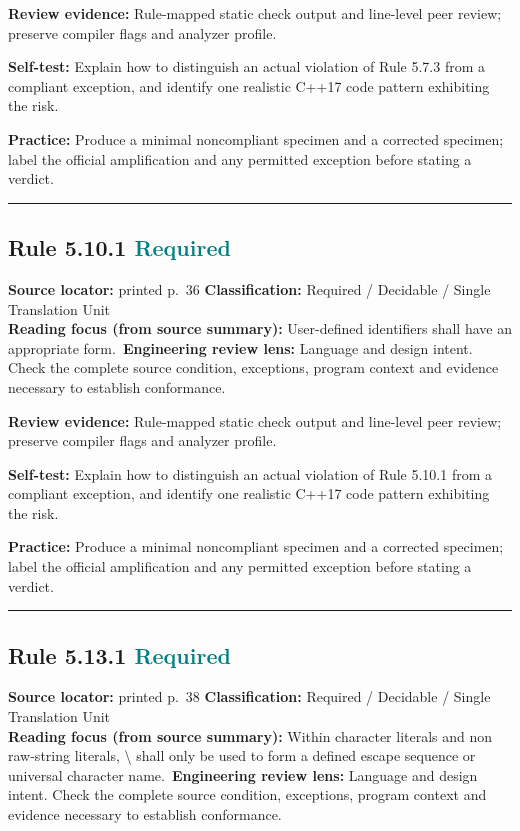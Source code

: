 \documentclass[10pt,letterpaper]{article}
\begin{document}
\textbf{Review evidence:} Rule-mapped static check output and line-level peer review; preserve compiler flags and analyzer profile.

\textbf{Self-test:} Explain how to distinguish an actual violation of Rule 5.7.3 from a compliant exception, and identify one realistic C++17 code pattern exhibiting the risk.\par
\textbf{Practice:} Produce a minimal noncompliant specimen and a corrected specimen; label the official amplification and any permitted exception before stating a verdict.
\smallskip\hrule\smallskip
\subsection*{Rule 5.10.1 \enspace \texorpdfstring{\small\textcolor{teal}{Required}}{Required}}
\noindent\textbf{Source locator:} printed p.~36 \quad\textbf{Classification:} Required / Decidable / Single Translation Unit\\
\textbf{Reading focus (from source summary):} User-defined identifiers shall have an appropriate form.\
\textbf{Engineering review lens:} Language and design intent. Check the complete source condition, exceptions, program context and evidence necessary to establish conformance.

\textbf{Review evidence:} Rule-mapped static check output and line-level peer review; preserve compiler flags and analyzer profile.

\textbf{Self-test:} Explain how to distinguish an actual violation of Rule 5.10.1 from a compliant exception, and identify one realistic C++17 code pattern exhibiting the risk.\par
\textbf{Practice:} Produce a minimal noncompliant specimen and a corrected specimen; label the official amplification and any permitted exception before stating a verdict.
\smallskip\hrule\smallskip
\subsection*{Rule 5.13.1 \enspace \texorpdfstring{\small\textcolor{teal}{Required}}{Required}}
\noindent\textbf{Source locator:} printed p.~38 \quad\textbf{Classification:} Required / Decidable / Single Translation Unit\\
\textbf{Reading focus (from source summary):} Within character literals and non raw-string literals, \textbackslash{} shall only be used to form a defined escape sequence or universal character name.\
\textbf{Engineering review lens:} Language and design intent. Check the complete source condition, exceptions, program context and evidence necessary to establish conformance.
\end{document}
